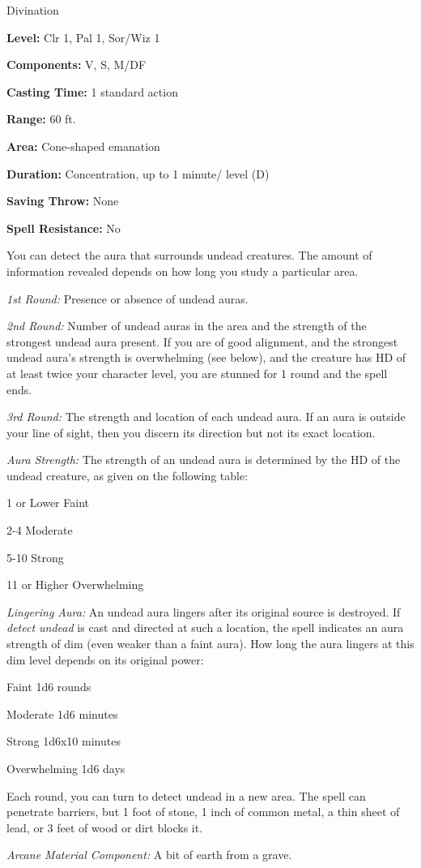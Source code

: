 
Divination

\textbf{Level:} Clr 1, Pal 1, Sor/Wiz 1

\textbf{Components:} V, S, M/DF

\textbf{Casting Time:} 1 standard action

\textbf{Range:} 60 ft.

\textbf{Area:} Cone-shaped emanation

\textbf{Duration:} Concentration, up to 1 minute/ level (D)

\textbf{Saving Throw:} None

\textbf{Spell Resistance:} No

You can detect the aura that surrounds undead creatures. The amount of information 
revealed depends on how long you study a particular area.

\textit{1st Round:} Presence or absence of undead auras.

\textit{2nd Round:} Number of undead auras in the area and the strength of the 
strongest undead aura present. If you are of good alignment, and the strongest 
undead aura's strength is overwhelming (see below), and the creature has HD of 
at least twice your character level, you are stunned for 1 round and the spell 
ends.

\textit{3rd Round:} The strength and location of each undead aura. If an aura is 
outside your line of sight, then you discern its direction but not its exact location.

\textit{Aura Strength:} The strength of an undead aura is determined by the HD 
of the undead creature, as given on the following table:

\begin{description*}
\item[1 or Lower] Faint
\item[2-4] Moderate
\item[5-10] Strong
\item[11 or Higher] Overwhelming
\end{description*}

\textit{Lingering Aura:} An undead aura lingers after its original source is destroyed. 
If \textit{detect undead} is cast and directed at such a location, the spell indicates 
an aura strength of dim (even weaker than a faint aura). How long the aura lingers 
at this dim level depends on its original power:

\begin{description*}
\item[Faint] 1d6 rounds
\item[Moderate] 1d6 minutes
\item[Strong] 1d6x10 minutes
\item[Overwhelming] 1d6 days
\end{description*}

Each round, you can turn to detect undead in a new area. The spell can penetrate 
barriers, but 1 foot of stone, 1 inch of common metal, a thin sheet of lead, or 
3 feet of wood or dirt blocks it.

\textit{Arcane Material Component:} A bit of earth from a grave.

